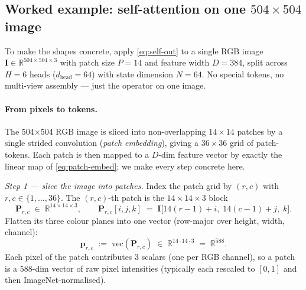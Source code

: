 \documentclass[11pt,a4paper]{article}
\begin{document}
\subsection{Worked example: self-attention on one $504\!\times\!504$ image}
\label{sec:self-worked}

To make the shapes concrete, apply \eqref{eq:self-out} to a single RGB
image $\bm{I}\in\mathbb{R}^{504\times 504\times 3}$ with patch size
$P=14$ and feature width $D=384$, split across $H=6$ heads
($d_{\text{head}}=64$) with state dimension $N=64$. No special tokens,
no multi-view assembly — just the operator on one image.

\paragraph{From pixels to tokens.}
The 504$\times$504 RGB image is sliced into non-overlapping
$14\!\times\!14$ patches by a single strided convolution
(\emph{patch embedding}), giving a $36\!\times\!36$ grid of
patch-tokens. Each patch is then mapped to a $D$-dim feature vector
by exactly the linear map of \eqref{eq:patch-embed}; we make every
step concrete here.

\medskip
\noindent\emph{Step 1 — slice the image into patches.}
Index the patch grid by $(r, c)$ with $r, c \in \{1, \dots, 36\}$.
The $(r, c)$-th patch is the $14\!\times\!14\!\times\!3$ block
\begin{equation}
  \bm{P}_{r,c} \;\in\; \mathbb{R}^{14\times 14\times 3},
  \qquad
  \bm{P}_{r,c}[i, j, k] \;=\; \bm{I}\bigl[14(r{-}1){+}i,\; 14(c{-}1){+}j,\; k\bigr].
\end{equation}
Flatten its three colour planes into one vector (row-major over
height, width, channel):
\begin{equation}
  \bm{p}_{r,c} \;:=\; \mathrm{vec}(\bm{P}_{r,c})
   \;\in\; \mathbb{R}^{14 \cdot 14 \cdot 3} \;=\; \mathbb{R}^{588}.
\end{equation}
Each pixel of the patch contributes 3 scalars (one per RGB channel),
so a patch is a $588$-dim vector of raw pixel intensities (typically
each rescaled to $[0, 1]$ and then ImageNet-normalised).
\end{document}
